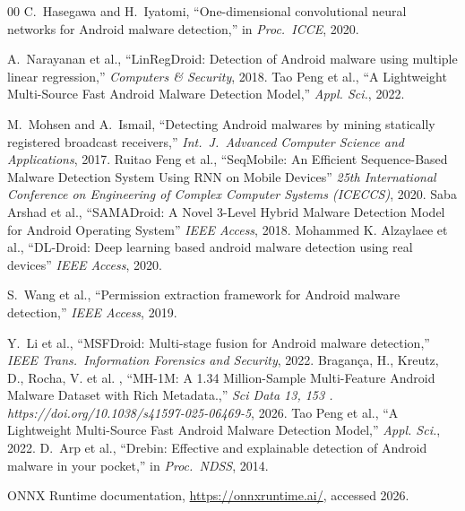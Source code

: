 \documentclass[conference]{IEEEtran}
\begin{document}
		\begin{thebibliography}{00}
			C.~Hasegawa and H.~Iyatomi,
			``One-dimensional convolutional neural networks for Android malware detection,''
			in \textit{Proc.\ ICCE}, 2020.
			
			A.~Narayanan et al.,
			``LinRegDroid: Detection of Android malware using multiple linear regression,''
			\textit{Computers \& Security}, 2018.
			Tao Peng et al.,
			``A Lightweight Multi-Source Fast Android Malware Detection Model,''
			\textit{Appl. Sci.}, 2022.
			
			
			M.~Mohsen and A.~Ismail,
			``Detecting Android malwares by mining statically registered broadcast receivers,''
			\textit{Int.\ J.\ Advanced Computer Science and Applications}, 2017.
			Ruitao Feng et al.,
			``SeqMobile: An Efficient Sequence-Based Malware Detection System Using RNN on Mobile Devices''
			\textit{ 25th International Conference on Engineering of Complex Computer Systems (ICECCS)}, 2020.
			Saba Arshad et al.,
			``SAMADroid: A Novel 3-Level Hybrid Malware Detection Model for Android Operating System''
			\textit{IEEE Access}, 2018.
			Mohammed K. Alzaylaee et al.,
			``DL-Droid: Deep learning based android malware detection using real devices''
			\textit{IEEE Access}, 2020.
			
			S.~Wang et al.,
			``Permission extraction framework for Android malware detection,''
			\textit{IEEE Access}, 2019.
			
			Y.~Li et al.,
			``MSFDroid: Multi-stage fusion for Android malware detection,''
			\textit{IEEE Trans.\ Information Forensics and Security}, 2022.
			Bragança, H., Kreutz, D., Rocha, V. et al. ,
			``MH-1M: A 1.34 Million-Sample Multi-Feature Android Malware Dataset with Rich Metadata.,''
			\textit{Sci Data 13, 153 . https://doi.org/10.1038/s41597-025-06469-5}, 2026.
			Tao Peng et al.,
			``A Lightweight Multi-Source Fast Android Malware Detection Model,''
			\textit{Appl. Sci.}, 2022.
			D.~Arp et al.,
			``Drebin: Effective and explainable detection of Android malware in your pocket,''
			in \textit{Proc.\ NDSS}, 2014.
			
			ONNX Runtime documentation,
			\url{https://onnxruntime.ai/}, accessed 2026.
		\end{thebibliography}
		
		
		
		
	
\end{document}
